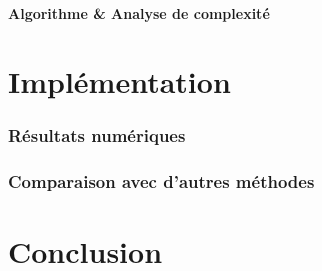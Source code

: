 \documentclass[a4paper]{article} %
\numberwithin{section}{part}
\numberwithin{equation}{section}
\begin{document}
\subsection{Algorithme \& Analyse de complexité}

\part{Implémentation}
\section{Résultats numériques}

\section{Comparaison avec d'autres méthodes}

\part{Conclusion}
\end{document}
